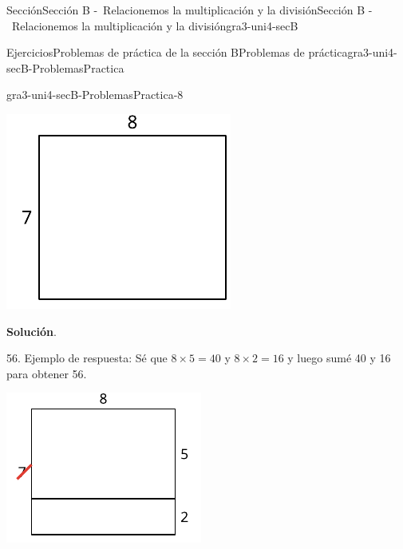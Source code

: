 \documentclass[oneside,10pt,]{article}
\newcommand{\blocktitlefont}{\relax}
\begin{document}
\begin{sectionptx}{Sección}{Sección B -~Relacionemos la multiplicación y la división}{}{Sección B -~Relacionemos la multiplicación y la división}{}{}{gra3-uni4-secB}
\begin{exercises-subsection}{Ejercicios}{Problemas de práctica de la sección B}{}{Problemas de práctica}{}{}{gra3-uni4-secB-ProblemasPractica}
\begin{divisionexercise}{6}{}{}{gra3-uni4-secB-ProblemasPractica-8}
\begin{sidebyside}{2}{0}{0}{0}
\begin{sbspanel}{0.4}
\includegraphics[width=\linewidth]{external/svg-source/tikz-file-159147-scale13.pdf}
\end{sbspanel}%
\end{sidebyside}%
\par\smallskip%
\noindent\textbf{\blocktitlefont Solución}.\hypertarget{gra3-uni4-secB-ProblemasPractica-8-2}{}\quad{}\begin{sidebyside}{2}{0}{0}{0}%
\begin{sbspanel}{0.6}%
56. Ejemplo de respuesta: Sé que \(8 \times 5 = 40\) y \(8 \times 2 = 16\) y luego sumé 40 y 16 para obtener 56.%
\end{sbspanel}%
\begin{sbspanel}{0.4}%
\includegraphics[width=\linewidth]{external/svg-source/tikz-file-159148.pdf}

\end{sbspanel}
\end{sidebyside}
\end{divisionexercise}
\end{exercises-subsection}
\end{sectionptx}
\end{document}
